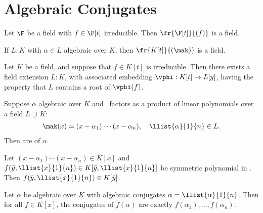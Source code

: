 \documentclass[a4paper]{article}
\begin{document}
\section{Algebraic Conjugates}

\begin{tlemma}
  Let \( \F \) be a field with \( f\in \F[t] \) irreducible.
  Then \( \fr{\F[t]}{(f)} \) is a field.
\end{tlemma}

\begin{tcorollary}
  If \( L:K \) with \( \alpha\in L \) algebraic over \( K \), then \( \fr{K[t]}{(\mak)} \) is a field.
\end{tcorollary}

\begin{ttheorem}
  Let $ K $ be a field, and suppose that $ f\in K[t] $ is irreducible.
  Then there exists a field extension $ L:K $, with associated embedding $ \vphi:K[t]\to L[y] $, having the property that $ L $ contains a root of $ \vphi(f) $.
\end{ttheorem}

\begin{tdefinition}
  Suppose \( \alpha \) algebraic over \( K \) and \mak~factors as a product of linear polynomials over a field \( L\supseteq K \): \begin{align*}
    \mak(x) = (x-\alpha_1)\cdots(x-\alpha_n),\quad \llist{\alpha}{1}{n}\in L.
  \end{align*}
  Then  are  of \( \alpha \).
\end{tdefinition}

\begin{tlemma}
  Let \( (x-\alpha_1)\cdots(x-\alpha_n)\in K[x] \) and \( f(\bar y,\llist{x}{1}{n})\in K[\bar y,\llist{x}{1}{n}] \) be symmetric polynomial in .
  Then \( f(\bar y,\llist{x}{1}{n}) \in K[\bar y]\).
\end{tlemma}

\begin{ttheorem}
  Let \( \alpha \) be algebraic over \( K \) with algebraic conjugates \( \alpha=\llist{\alpha}{1}{n} \).
  Then for all \( f\in K[x] \), the conjugates of \( f(\alpha) \) are exactly \( f(\alpha_1),\ldots,f(\alpha_n) \).
\end{ttheorem}
\end{document}
